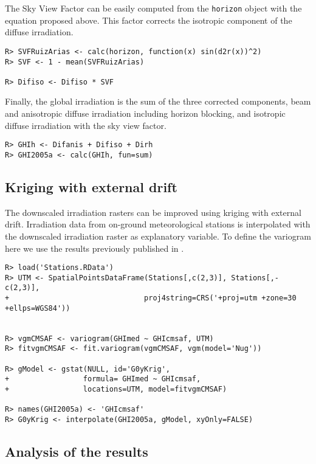 \documentclass[authoryear, sort&compress]{elsarticle}
\begin{document}
The Sky View Factor can be easily computed from the \texttt{horizon}
object with the equation proposed above. This factor corrects the
isotropic component of the diffuse irradiation.

\lstset{language=R,numbers=none}
\begin{lstlisting} 
R> SVFRuizArias <- calc(horizon, function(x) sin(d2r(x))^2)
R> SVF <- 1 - mean(SVFRuizArias)

R> Difiso <- Difiso * SVF
\end{lstlisting}

Finally, the global irradiation is the sum of the three corrected
components, beam and anisotropic diffuse irradiation including horizon
blocking, and isotropic diffuse irradiation with the sky view factor.

\lstset{language=R,numbers=none}
\begin{lstlisting} 
R> GHIh <- Difanis + Difiso + Dirh
R> GHI2005a <- calc(GHIh, fun=sum)
\end{lstlisting}

\subsection{Kriging with external drift}
\label{sec-1-6}

The downscaled irradiation rasters can be improved using kriging
with external drift. Irradiation data from on-ground
meteorological stations is interpolated with the downscaled
irradiation raster as explanatory variable. To define the
variogram here we use the results previously published in
\citep{Antonanzas-Torres.Canizares.ea2013}.


\lstset{language=R,numbers=none}
\begin{lstlisting} 
R> load('Stations.RData')
R> UTM <- SpatialPointsDataFrame(Stations[,c(2,3)], Stations[,-c(2,3)],
+                               proj4string=CRS('+proj=utm +zone=30 +ellps=WGS84'))


R> vgmCMSAF <- variogram(GHImed ~ GHIcmsaf, UTM)
R> fitvgmCMSAF <- fit.variogram(vgmCMSAF, vgm(model='Nug'))

R> gModel <- gstat(NULL, id='G0yKrig',
+                 formula= GHImed ~ GHIcmsaf,
+                 locations=UTM, model=fitvgmCMSAF)

R> names(GHI2005a) <- 'GHIcmsaf'
R> G0yKrig <- interpolate(GHI2005a, gModel, xyOnly=FALSE)
\end{lstlisting}


\subsection{Analysis of the results}
\label{sec-1-7}
\end{document}
